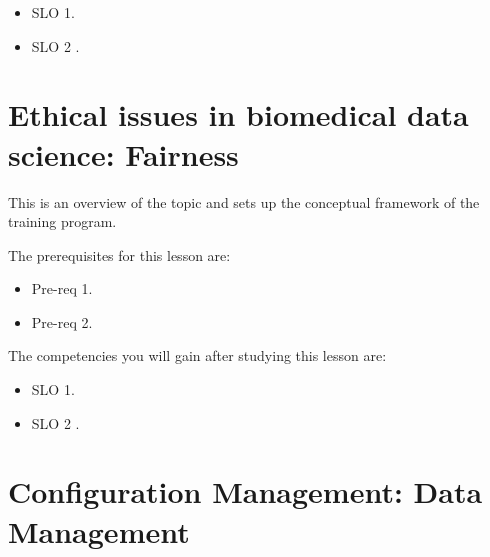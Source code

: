 \begin{itemize}
    \item SLO 1.
\end{itemize}

\begin{itemize}
    \item SLO 2 .
\end{itemize}

\section{Ethical issues in biomedical data science: Fairness}
\label{sec:ethical-issues-in-biomedical-data-science-fairness}

This is an overview of the topic and sets up the conceptual framework of the training program.




The prerequisites for this lesson are: 




\begin{itemize}
    \item Pre-req 1.
\end{itemize}

\begin{itemize}
    \item Pre-req 2.
\end{itemize}




The competencies you will gain after studying this lesson are: 




\begin{itemize}
    \item SLO 1.
\end{itemize}

\begin{itemize}
    \item SLO 2 .
\end{itemize}

\section{Configuration Management: Data Management}
\label{sec:configuration-management-data-management}


